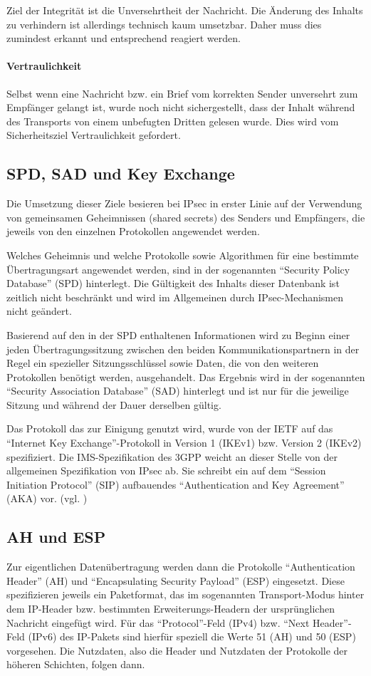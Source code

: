 Ziel der Integrität ist die Unversehrtheit der Nachricht. Die Änderung des Inhalts zu verhindern ist allerdings technisch kaum umsetzbar. Daher muss dies zumindest erkannt und entsprechend reagiert werden.

\paragraph{Vertraulichkeit}
Selbst wenn eine Nachricht bzw. ein Brief vom korrekten Sender unversehrt zum Empfänger gelangt ist, wurde noch nicht sichergestellt, dass der Inhalt während des Transports von einem unbefugten Dritten gelesen wurde. Dies wird vom Sicherheitsziel Vertraulichkeit gefordert.

\subsection{SPD, SAD und Key Exchange}
Die Umsetzung dieser Ziele besieren bei IPsec in erster Linie auf der Verwendung von gemeinsamen Geheimnissen (shared secrets) des Senders und Empfängers, die jeweils von den einzelnen Protokollen angewendet werden.

Welches Geheimnis und welche Protokolle sowie Algorithmen für eine bestimmte Übertragungsart angewendet werden, sind in der sogenannten “Security Policy Database” (SPD) hinterlegt. Die Gültigkeit des Inhalts dieser Datenbank ist zeitlich nicht beschränkt und wird im Allgemeinen durch IPsec-Mechanismen nicht geändert.

Basierend auf den in der SPD enthaltenen Informationen wird zu Beginn einer jeden Übertragungssitzung zwischen den beiden Kommunikationspartnern in der Regel ein spezieller Sitzungsschlüssel sowie Daten, die von den weiteren Protokollen benötigt werden, ausgehandelt. Das Ergebnis wird in der sogenannten “Security Association Database” (SAD) hinterlegt und ist nur für die jeweilige Sitzung und während der Dauer derselben gültig.

Das Protokoll das zur Einigung genutzt wird, wurde von der IETF auf das “Internet Key Exchange”-Protokoll in Version 1 (IKEv1) bzw. Version 2 (IKEv2) spezifiziert. Die IMS-Spezifikation des 3GPP weicht an dieser Stelle von der allgemeinen Spezifikation von IPsec ab. Sie schreibt ein auf dem “Session Initiation Protocol” (SIP) aufbauendes “Authentication and Key Agreement” (AKA) vor. (vgl. \cite{S.S0086-B})

\subsection{AH und ESP}
Zur eigentlichen Datenübertragung werden dann die Protokolle “Authentication Header” (AH) und “Encapsulating Security Payload” (ESP) eingesetzt. Diese spezifizieren jeweils ein Paketformat, das im sogenannten Transport-Modus hinter dem IP-Header bzw. bestimmten Erweiterungs-Headern der ursprünglichen Nachricht eingefügt wird. Für das “Protocol”-Feld (IPv4) bzw. “Next Header”-Feld (IPv6) des IP-Pakets sind hierfür speziell die Werte 51 (AH) und 50 (ESP) vorgesehen. Die Nutzdaten, also die Header und Nutzdaten der Protokolle der höheren Schichten, folgen dann.

